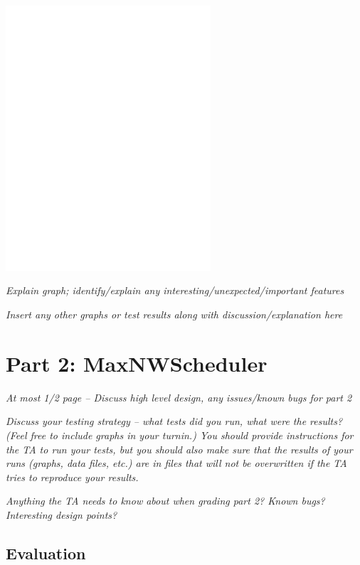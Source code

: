 \documentclass[11pt, letterpaper]{article}
\begin{document}
\centerline{\includegraphics[width=3in]{plot2b}}

{\em Explain graph; identify/explain any
  interesting/unexpected/important features}


{\em Insert any other graphs or test results along with
  discussion/explanation here}





\section{Part 2: MaxNWScheduler}

{\em At most 1/2 page -- Discuss high level design, any issues/known
  bugs for part 2}

{\em Discuss your testing strategy -- what tests did you run, what were the
results?  (Feel free to include graphs in your turnin.) You should
provide instructions for the TA to run your tests, but you should also
make sure that the results of your runs (graphs, data files, etc.) are
in files that will not be overwritten if the TA tries to reproduce
your results.}

{\em Anything the TA needs to know about when grading part 2? Known bugs?
Interesting design points?}


\subsection{Evaluation}
\end{document}
